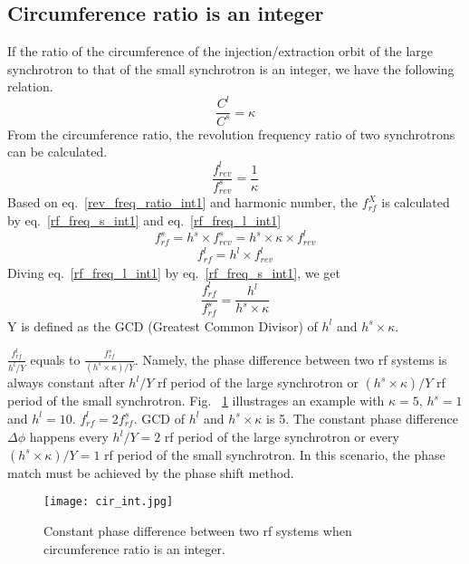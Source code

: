\subsection{Circumference ratio is an integer}
If the ratio of the circumference of the injection/extraction orbit of the large synchrotron to that of the small synchrotron is an integer, we have the following relation. 
\begin{equation}
\frac{C^l}{C^s}=\kappa \label{circumference_ratio_int1}
\end{equation}
From the circumference ratio, the revolution frequency ratio of two synchrotrons can be calculated.
\begin{equation}
\frac{f_{\mathit{rev}}^{l}}{f_{\mathit{rev}}^{s}}=\frac{1}{\kappa} \label{rev_freq_ratio_int1}
\end{equation}
Based on eq.~\ref{rev_freq_ratio_int1} and harmonic number, the $f_{rf}^{X}$ is calculated by eq.~\ref{rf_freq_s_int1} and eq.~\ref{rf_freq_l_int1}
\begin{equation} 
f_{\mathit{rf}}^{s}= h^s \times f_{\mathit{rev}}^{s}=h^s \times \kappa \times f_{rev}^{l} \label{rf_freq_s_int1}
\end{equation}
\begin{equation} 
f_{\mathit{rf}}^{l}= h^l \times f_{\mathit{rev}}^{l} \label{rf_freq_l_int1}
\end{equation}
Diving eq.~\ref{rf_freq_l_int1} by eq.~\ref{rf_freq_s_int1}, we get
\begin{equation} 
\frac{f_{\mathit{rf}}^{l}}{f_{\mathit{rf}}^{s}}= \frac{h^l}{h^s \times \kappa} \label{rf_freq_ratio1}
\end{equation}
Y is defined as the \gls{GCD} (Greatest Common Divisor) of $h^l$ and $h^s \times \kappa$.

$\frac{f_{\mathit{rf}}^{l}}{h^l/Y}$ equals to $\frac{f_{\mathit{rf}}^{s}}{(h^s\times \kappa)/Y}$. Namely, the phase difference between two rf systems is always constant after ${h^l/Y}$ rf period of the large synchrotron or ${(h^s\times \kappa)/Y}$ rf period of the small synchrotron. Fig. ~\ref{cir_int} illustrages an example with $\kappa=5$, $h^s=1$ and $h^l=10$. $f_{\mathit{rf}}^{l}=2f_{\mathit{rf}}^{s}$. GCD of $h^l$ and $h^s \times \kappa$ is 5. The constant phase difference $\Delta\phi$ happens every ${h^l/Y}=2$ rf period of the large synchrotron or every ${(h^s\times \kappa)/Y}=1$ rf period of the small synchrotron. In this scenario, the phase match must be achieved by the phase shift method.
\begin{figure}[!htb]
   \centering   
   \texttt{[image: cir\_int.jpg]}
   \caption{Constant phase difference between two rf systems when circumference ratio is an integer.}
   \label{cir_int}
\end{figure} 
